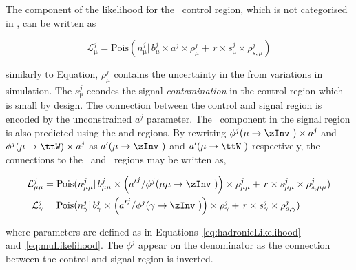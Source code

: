 The component of the likelihood for the \mj~control region, which is not categorised in \mht, can be written as

\begin{equation}
\label{eq:muLikelihood}
\mathcal{L}^{j}_{\mathrm{\mu}} = \mathrm{Pois}(n^{j}_{\mathrm{\mu}} |\, b^{j}_{\mu}\times a^{j}\times\rho^{j}_{\mu} + \,r \times s^{j}_{\mathrm{\mu}}\times\rho^{j}_{s,\mu})
\end{equation}

similarly to Equation, $\rho^{j}_{\mu}$ contains the uncertainty in the \htcat from variations in simulation. The $s^{j}_{\mathrm{\mu}}$
econdes the signal \emph{contamination} in the control region which is small by design. The connection between the control and signal region
is encoded by the unconstrained $a^{j}$ parameter. The \zInv~component in the signal 
region is also predicted using the \gj and \mmj regions. By rewriting $\phi^{j}(\mu\rightarrow\zInv~)\times a^{j}$ and $\phi^{j}(\mu\rightarrow\ttW)\times a^{j}$
as ${a'}(\mu\rightarrow\zInv~)$ and $a'(\mu\rightarrow\ttW~)$ respectively, the connections to the \gj~and \mmj~regions
may be written as, 

\begin{align}
\label{eq:mumuLikelihood}
\mathcal{L}^{j}_{\mathrm{\mu\mu}} &= \mathrm{Pois}(n^{j}_{\mathrm{\mu\mu}} |\, b^{j}_{\mu\mu}\times 
\left({a'}^{j}/\phi^{j}(\mu\mu\rightarrow\zInv~)\right)\times\rho^{j}_{\mu\mu} + \,r\times s^{j}_{\mathrm{\mu\mu}}\times\rho^{j}_{s,\mu\mu}) \\
\mathcal{L}^{j}_{\mathrm{\gamma}} &= \mathrm{Pois}(n^{j}_{\mathrm{\gamma}} |\, b^{j}_{\gamma}\times 
\left({a'}^{j}/\phi^{j}(\gamma\rightarrow\zInv~)\right)\times\rho^{j}_{\gamma} + \,r\times s^{j}_{\mathrm{\gamma}}\times\rho^{j}_{s,\gamma})
\end{align}

where parameters are defined as in Equations~\ref{eq:hadronicLikelihood} and~\ref{eq:muLikelihood}. 
The $\phi^{j}$ appear on the denominator as the connection between the control and signal region is 
inverted.

